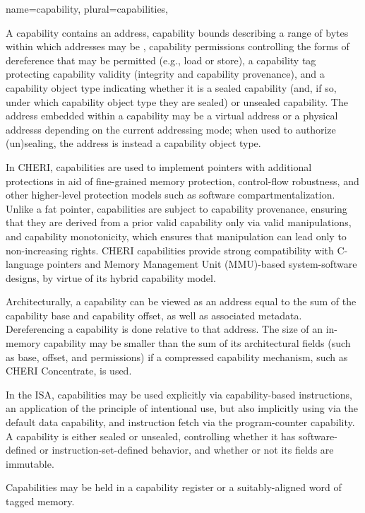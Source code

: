 {
  name=capability,
  plural=capabilities,
}
{
  A capability contains an \gls{address}, \gls{capability bounds}
  describing a range of bytes within which addresses may be
  , \gls{capability permissions}
  controlling the forms of dereference that may be permitted (e.g., load or
  store), a \gls{capability tag} protecting \gls{capability validity}
  (integrity and \gls{capability provenance}), and a \gls{capability object type}
  indicating whether it is a \gls{sealed capability}
  (and, if so, under which \gls{capability object type} they are sealed)
  or \gls{unsealed capability}.
  The address embedded within a capability may be a \gls{virtual address} or
  a \glspl{physical address} depending on the current addressing mode; when
  used to authorize (un)sealing, the address is instead a
  \gls{capability object type}.

  In CHERI, capabilities are used to implement \glspl{pointer} with additional
  protections in aid of \gls{fine-grained memory protection},
  \gls{control-flow robustness}, and other higher-level protection models such
  as \gls{software compartmentalization}.
  Unlike a \gls{fat pointer}, capabilities are subject to
  \gls{capability provenance}, ensuring that they are derived from a prior
  valid capability only via valid manipulations, and \gls{capability
  monotonicity}, which ensures that manipulation can lead only to
  non-increasing rights.
  CHERI capabilities provide strong compatibility with C-language pointers and
  Memory Management Unit (MMU)-based system-software designs, by virtue of
  its \gls{hybrid capability model}.

  Architecturally, a capability can be viewed as an \gls{address} equal to the
  sum of the \gls{capability base} and \gls{capability offset}, as well as
  associated metadata.
  Dereferencing a capability is done relative to that address.
  The size of an in-memory capability may be smaller than the sum of its
  architectural fields (such as base, offset, and permissions) if a
  \gls{compressed capability} mechanism, such as \gls{CHERI Concentrate}, is
  used.

  In the ISA, capabilities may be used explicitly via \gls{capability-based
  instructions}, an application of the \gls{principle of intentional use},
  but also implicitly using  via the \gls{default data capability}, and
  instruction fetch via the \gls{program-counter capability}.
  A capability is either sealed or unsealed, controlling whether it has
  software-defined or instruction-set-defined behavior, and whether or not its
  fields are immutable.

  Capabilities may be held in a \gls{capability register} or a
  suitably-aligned word of \gls{tagged memory}.
}

